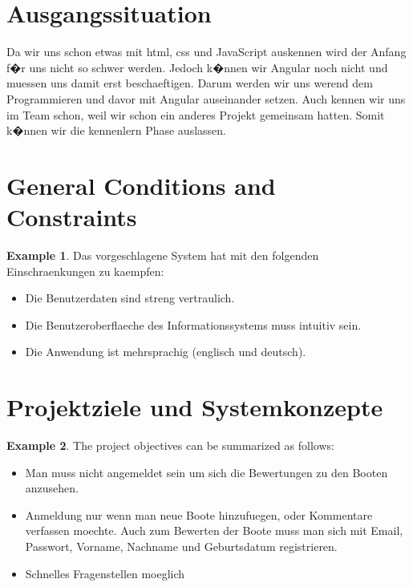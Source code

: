 \documentclass[12pt]{article}
\theoremstyle{definition}
\newtheorem{example}{Example}
\newenvironment{explanation}{%
   \setlength{\parindent}{0pt}
   \itshape
   \color{blue}
}{}
\begin{document}
\section{Ausgangssituation}
\begin{explanation}
Da wir uns schon etwas mit html, css und JavaScript auskennen wird der Anfang f�r uns nicht so schwer werden.
Jedoch k�nnen wir Angular noch nicht und muessen uns damit erst beschaeftigen. Darum werden wir uns werend dem Programmieren und davor mit Angular auseinander setzen. Auch kennen wir uns im Team schon, weil wir schon ein anderes Projekt gemeinsam hatten. Somit k�nnen wir die kennenlern Phase auslassen.
\end{explanation}

\pagebreak

\section{General Conditions and Constraints}

\begin{example}
Das vorgeschlagene System hat mit den folgenden Einschraenkungen zu kaempfen:
\begin{itemize}
\item Die Benutzerdaten sind streng vertraulich.
\item Die Benutzeroberflaeche des Informationssystems muss intuitiv sein.
\item Die Anwendung ist mehrsprachig (englisch und deutsch).
\end{itemize}
\end{example}

\pagebreak

\section{Projektziele und Systemkonzepte}
\begin{example}
The project objectives can be summarized as follows:
\begin{itemize}
\item Man muss nicht angemeldet sein um sich die Bewertungen zu den Booten anzusehen.
\item Anmeldung nur wenn man neue Boote hinzufuegen, oder Kommentare verfassen moechte.
Auch zum Bewerten der Boote muss man sich mit Email, Passwort, Vorname, Nachname und Geburtsdatum registrieren.
\item Schnelles Fragenstellen moeglich
\end{itemize}
\end{example}
\end{document}
